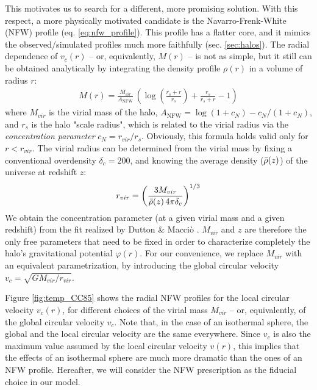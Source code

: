 This motivates us to search for a different, more promising solution. With this respect, a more physically motivated candidate is the Navarro-Frenk-White (NFW) profile (eq. \ref{eq:nfw_profile}). This profile has a flatter core, and it mimics the observed/simulated profiles much more faithfully (sec. \ref{sec:halos}). The radial dependence of $v_c(r)$ -- or, equivalently, $M(r)$ -- is not as simple, but it still can be obtained analytically by integrating the density profile $\rho(r)$ in a volume of radius $r$:
\begin{align}
M(r) = \frac{M_{vir}}{A_\mathrm{NFW}}\, \left(\log\left(\frac{r_s + r}{r_s}\right) + \frac{r_s}{r_s + r} -1\right) 
\end{align}
where $M_{vir}$ is the virial mass of the halo, $A_\mathrm{NFW} = \log(1+c_N) - c_N/(1+c_N)$, and $r_s$ is the halo "scale radius", which is related to the virial radius via the \textit{concentration parameter} $c_N = r_{vir}/r_s$. Obviously, this formula holds valid only for $r<r_{vir}$. The virial radius can be determined from the virial mass by fixing a conventional overdensity $\delta_c = 200$, and knowing the average density ($\Bar{\rho}(z)$) of the universe at redshift $z$:
\begin{align}
r_{vir} = \left(\frac{3M_{vir}}{\Bar{\rho}(z)\,4\pi \delta_c}\right)^{1/3}
\end{align}
We obtain the concentration parameter (at a given virial mass and a given redshift) from the fit realized by Dutton \& Macciò \citep{dutton2014cold}. $M_{vir}$ and $z$ are therefore the only free parameters that need to be fixed in order to characterize completely the halo's gravitational potential $\varphi(r)$. For our convenience, we replace $M_{vir}$ with an equivalent parametrization, by introducing the global circular velocity $v_c = \sqrt{GM_{vir}/r_{vir}}$. 

Figure \ref{fig:temp_CC85} shows the radial NFW profiles for the local circular velocity $v_c(r)$, for different choices of the virial mass $M_{vir}$ -- or, equivalently, of the global circular velocity $v_c$. Note that, in the case of an isothermal sphere, the global and the local circular velocity are the same everywhere. Since $v_c$ is also the maximum value assumed by the local circular velocity $v(r)$, this implies that the effects of an isothermal sphere are much more dramatic than the ones of an NFW profile. Hereafter, we will consider the NFW prescription as the fiducial choice in our model.



